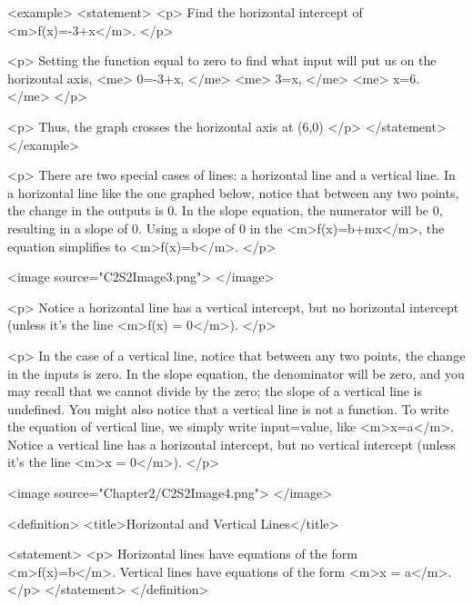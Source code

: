         <example>
            <statement>
                <p>
                    Find the horizontal intercept of <m>f(x)=-3+x</m>.
                </p>

                <p>
                    Setting the function equal to zero to find what input will put us on the horizontal axis,
                    <me>
                        0=-3+x,
                    </me>
                    <me>
                        3=x,
                    </me>
                    <me>
                        x=6.
                    </me>
                </p>

                <p>
                    Thus, the graph crosses the horizontal axis at (6,0)
                </p>
            </statement>
        </example>

        <p>
            There are two special cases of lines: a horizontal line and a vertical line.
            In a horizontal line like the one graphed below, notice that between any two points, the change in the outputs is 0.
            In the slope equation, the numerator will be 0, resulting in a slope of 0.
            Using a slope of 0 in the <m>f(x)=b+mx</m>, the equation simplifies to <m>f(x)=b</m>.
        </p>

        <image source="C2S2Image3.png">
        </image>

        <p>
            Notice a horizontal line has a vertical intercept, but no horizontal intercept (unless it’s the line <m>f(x) = 0</m>).
        </p>

        <p>
            In the case of a vertical line, notice that between any two points, the change in the inputs is zero.
            In the slope equation, the denominator will be zero, and you may recall that we cannot divide by the zero; the slope of a vertical line is undefined.
            You might also notice that a vertical line is not a function.
            To write the equation of vertical line, we simply write input=value, like <m>x=a</m>.
            Notice a vertical line has a horizontal intercept, but no vertical intercept (unless it’s the line <m>x = 0</m>).
        </p>

        <image source="Chapter2/C2S2Image4.png">
        </image>

        <definition>
            <title>Horizontal and Vertical Lines</title>

            <statement>
                <p>
                    Horizontal lines have equations of the form <m>f(x)=b</m>.
                    Vertical lines have equations of the form <m>x = a</m>.
                </p>
            </statement>
        </definition>

